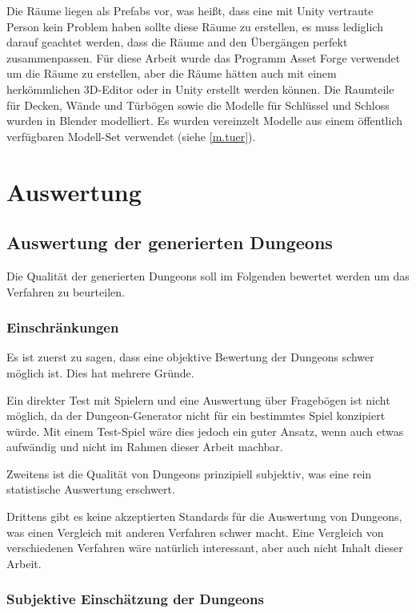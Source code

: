 Die Räume liegen als Prefabs vor, was heißt, dass eine mit Unity vertraute Person kein Problem haben sollte diese Räume zu erstellen, es muss lediglich darauf geachtet werden, dass die Räume and den Übergängen perfekt zusammenpassen. Für diese Arbeit wurde das Programm Asset Forge verwendet um die Räume zu erstellen, aber die Räume hätten auch mit einem herkömmlichen 3D-Editor oder in Unity erstellt werden können. Die Raumteile für Decken, Wände und Türbögen sowie die Modelle für Schlüssel und Schloss wurden in Blender modelliert. Es wurden vereinzelt Modelle aus einem öffentlich verfügbaren Modell-Set verwendet (siehe \ref{m.tuer}).

\chapter{Auswertung}

\section{Auswertung der generierten Dungeons}

Die Qualität der generierten Dungeons soll im Folgenden bewertet werden um das Verfahren zu beurteilen. 

\subsection{Einschränkungen}

Es ist zuerst zu sagen, dass eine objektive Bewertung der Dungeons schwer möglich ist. Dies hat mehrere Gründe.

Ein direkter Test mit Spielern und eine Auswertung über Fragebögen ist nicht möglich, da der Dungeon-Generator nicht für ein bestimmtes Spiel konzipiert würde. Mit einem Test-Spiel wäre dies jedoch ein guter Ansatz, wenn auch etwas aufwändig und nicht im Rahmen dieser Arbeit machbar.

Zweitens ist die Qualität von Dungeons prinzipiell subjektiv, was eine rein statistische Auswertung erschwert.

Drittens gibt es keine akzeptierten Standards für die Auswertung von Dungeons, was einen Vergleich mit anderen Verfahren schwer macht. Eine Vergleich von verschiedenen Verfahren wäre natürlich interessant, aber auch nicht Inhalt dieser Arbeit.

\subsection{Subjektive Einschätzung der Dungeons}

